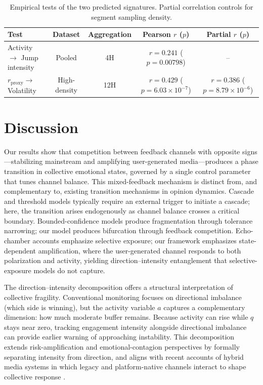 \documentclass[preprint,12pt]{elsarticle}
\begin{document}
\begin{table}[H]
  \centering
  \caption{Empirical tests of the two predicted signatures. Partial correlation controls for segment sampling density.}
  \label{tab:empirical}
  \footnotesize
  \setlength{\tabcolsep}{4pt}
  \begin{tabularx}{\linewidth}{YCCCC}
    \hline
    Test & Dataset & Aggregation & Pearson $r$ ($p$) & Partial $r$ ($p$) \\
    \hline
    Activity $\to$ Jump intensity & Pooled & 4H & $r=0.241$ ($p=0.00798$) & -- \\
    $r_{\text{proxy}}\to$ Volatility & High-density & 12H & $r=0.429$ ($p=6.03\times 10^{-7}$) & $r=0.386$ ($p=8.79\times 10^{-6}$) \\
    \hline
  \end{tabularx}
\end{table}

\FloatBarrier

\section{Discussion}
\label{sec:discussion}

Our results show that competition between feedback channels with opposite signs---stabilizing mainstream and amplifying user-generated media---produces a phase transition in collective emotional states, governed by a single control parameter that tunes channel balance. This mixed-feedback mechanism is distinct from, and complementary to, existing transition mechanisms in opinion dynamics. Cascade and threshold models \cite{Granovetter1978,Watts2002,CentolaMacy2007} typically require an external trigger to initiate a cascade; here, the transition arises endogenously as channel balance crosses a critical boundary. Bounded-confidence models \cite{Deffuant2000,HegselmannKrause2002} produce fragmentation through tolerance narrowing; our model produces bifurcation through feedback competition. Echo-chamber accounts \cite{Bakshy2015,DelVicario2016SciRep,DelVicario2016PNAS} emphasize selective exposure; our framework emphasizes state-dependent amplification, where the user-generated channel responds to both polarization and activity, yielding direction--intensity entanglement that selective-exposure models do not capture.

The direction--intensity decomposition offers a structural interpretation of collective fragility. Conventional monitoring focuses on directional imbalance (which side is winning), but the activity variable $a$ captures a complementary dimension: how much moderate buffer remains. Because activity can rise while $q$ stays near zero, tracking engagement intensity alongside directional imbalance can provide earlier warning of approaching instability. This decomposition extends risk-amplification \cite{Kasperson1988} and emotional-contagion \cite{Kramer2014,Fan2014,Brady2023} perspectives by formally separating intensity from direction, and aligns with recent accounts of hybrid media systems in which legacy and platform-native channels interact to shape collective response \cite{Chadwick2017}.
\end{document}
